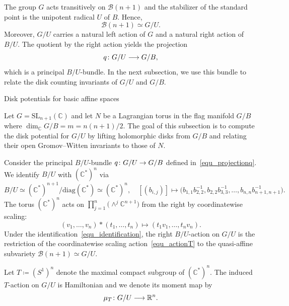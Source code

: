 \documentclass[11pt]{amsart}
\makeatletter
\def\subsection{\@startsection{subsection}{2}%
  \z@{-.8\linespacing\@plus-.3\linespacing}{.3\linespacing\@plus.2\linespacing}%
  {\normalfont\bfseries}}
\theoremstyle{plain}
\theoremstyle{definition}
\theoremstyle{remark}
\newcommand{\C}{\mathbb{C}}
\newcommand{\R}{\mathbb{R}}
\numberwithin{equation}{section} \numberwithin{table}{section}
\def\to{\mathchoice{\longrightarrow}{\rightarrow}{\rightarrow}{\rightarrow}}
\numberwithin{equation}{section}
\makeatother
\begin{document}
The group $G$ acts transitively on $\mathcal{B}(n+1)$ and the stabilizer of the standard point is the unipotent radical $U$ of $B$. Hence, 
$$
\mathcal{B}(n+1) \simeq G/U. 
$$
Moreover, $G/U$ carries a natural left action of $G$ and a natural right action of $B/U$. The quotient by the right action yields the projection
\begin{equation}\label{equ_projectionq}
q \colon G/U \to G/B,
\end{equation}
which is a principal $B/U$-bundle. In the next subsection, we use this bundle to relate the disk counting invariants of $G/U$ and $G/B$.





\subsection{Disk potentials for basic affine spaces}

Let $G = \mathrm{SL}_{n+1}(\C)$ and let $N$ be a Lagrangian torus in the flag manifold $G/B$ where $\dim_\C G/B = m = n(n+1)/2$. The goal of this subsection is to compute the disk potential for $G/U$ by lifting holomorphic disks from $G/B$ and relating their open Gromov--Witten invariants to those of $N$.

Consider the principal $B/U$-bundle $q \colon G/U \to G/B$ defined in~\eqref{equ_projectionq}. We identify $B/U$ with $(\C^*)^n$ via
\begin{equation}\label{equ_identification}
B/U \simeq (\C^*)^{n+1}/ \mathrm{diag}(\C^*) \simeq (\C^*)^n, \quad [(b_{i,j})] \mapsto \bigl(b_{1,1} b_{2,2}^{-1}, b_{2,2} b^{-1}_{3,3}, \dots, b_{n,n}b^{-1}_{n+1,n+1} \bigr).
\end{equation}
The torus $(\C^*)^n$ acts on $\prod_{j=1}^n \bigl(\wedge^j \C^{n+1}\bigr)$ from the right by coordinatewise scaling$\colon$
\begin{equation}\label{equ_actionT}
(v_1, \dots, v_n) * (t_1, \dots, t_n) \mapsto (t_1v_1, \dots, t_nv_n).
\end{equation}
Under the identification~\eqref{equ_identification}, the right $B/U$-action on $G/U$ is the restriction of the coordinatewise scaling action~\eqref{equ_actionT} to the quasi-affine subvariety $\mathcal{B}(n+1) \simeq G/U$.

Let $T \coloneqq (S^1)^n$ denote the maximal compact subgroup of $(\C^*)^n$. The induced $T$-action on $G/U$ is Hamiltonian and we denote its moment map by 
$$
\mu_T \colon G/U \to \R^n.
$$ 
\end{document}
